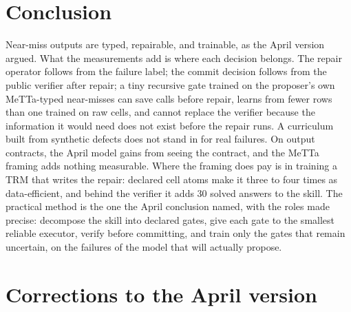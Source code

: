 \documentclass[11pt]{article}
\begin{document}
\section{Conclusion}

Near-miss outputs are typed, repairable, and trainable, as the April version argued. What the measurements add is where each decision belongs. The repair operator follows from the failure label; the commit decision follows from the public verifier after repair; a tiny recursive gate trained on the proposer's own MeTTa-typed near-misses can save calls before repair, learns from fewer rows than one trained on raw cells, and cannot replace the verifier because the information it would need does not exist before the repair runs. A curriculum built from synthetic defects does not stand in for real failures. On output contracts, the April model gains from seeing the contract, and the MeTTa framing adds nothing measurable. Where the framing does pay is in training a TRM that writes the repair: declared cell atoms make it three to four times as data-efficient, and behind the verifier it adds 30 solved answers to the skill. The practical method is the one the April conclusion named, with the roles made precise: decompose the skill into declared gates, give each gate to the smallest reliable executor, verify before committing, and train only the gates that remain uncertain, on the failures of the model that will actually propose.




\appendix

\section{Corrections to the April version}
\label{app:corrections}
\end{document}
